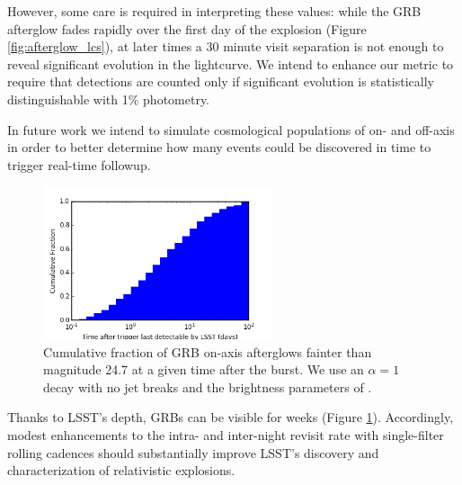However, some care is required in interpreting these values:
while the GRB afterglow fades rapidly over the first day of the explosion
(Figure \ref{fig:afterglow_lcs}), at later times a 30 minute visit
separation is not enough to reveal significant evolution in the lightcurve.
We intend to enhance our metric to require that detections are counted only
if significant evolution is statistically distinguishable with 1\%
photometry.

In future work we intend to simulate cosmological populations of on- and
off-axis in order to better determine how many events could be discovered
in time to trigger real-time followup.

\begin{figure}[hbt]
\centerline{
\includegraphics[width=0.6\textwidth]{figs/transients/afterglow_cdf.png}
}
\caption{ Cumulative fraction of GRB on-axis afterglows fainter than
magnitude 24.7 at a given time after the burst. We use an $\alpha=1$
decay with no jet breaks and the brightness parameters of
\citet{2011PASP..123.1034J}. }
\label{fig:afterglow_visibility}
\end{figure}

Thanks to LSST's depth, GRBs can be visible for weeks (Figure
\ref{fig:afterglow_visibility}).  Accordingly,
modest enhancements to the intra- and inter-night revisit rate with
single-filter rolling cadences should substantially improve LSST's
discovery and characterization of relativistic explosions.



\navigationbar
